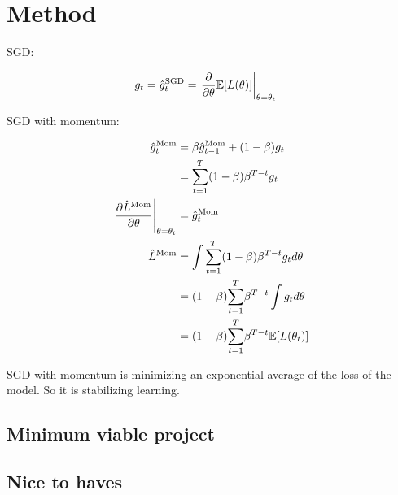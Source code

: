 \section{Method}

SGD:

\begin{align}
    g_t = {\hat{g}^{\text{SGD}}}_t &= \left.{\frac{\partial {}}{\partial\theta}}{\mathbb{E}}[L(\theta)]\right|_{\theta=\theta_t}
\end{align}

SGD with momentum:

\begin{align}
    {\hat{g}^{\text{Mom}}}_t
    &= \beta {\hat{g}^{\text{Mom}}}_{t-1}+(1-\beta) g_t\\
    &= {\sum_{t=1}^T} (1-\beta) \beta^{T-t} g_t\\
    \left. {\frac{\partial {{\hat{L}^{\text{Mom}}}}}{\partial\theta}} \right|_{\theta=\theta_t}&= {\hat{g}^{\text{Mom}}}_t\\
    {\hat{L}^{\text{Mom}}}
    &= \int {\sum_{t=1}^T} (1-\beta) \beta^{T-t} g_t d\theta\\
    &= (1-\beta){\sum_{t=1}^T} \beta^{T-t} \int g_t d\theta\\
    &= (1-\beta){\sum_{t=1}^T} \beta^{T-t} {\mathbb{E}}[L(\theta_t)]
\end{align}

SGD with momentum is minimizing an exponential average of the loss of the 
model. So it is stabilizing learning.
\subsection{Minimum viable project}
\subsection{Nice to haves}
